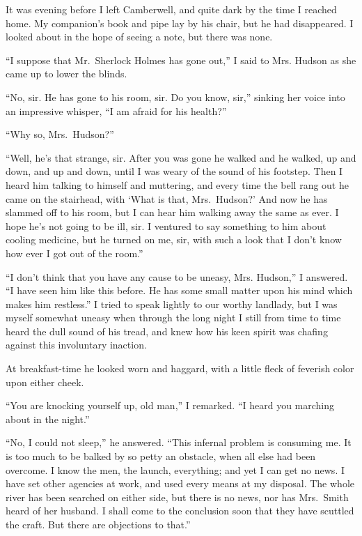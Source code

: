 \documentclass[12pt,english,oneside]{book}
\begin{document}
It was evening before I left Camberwell, and quite dark by the time
I reached home. My companion's book and pipe lay by his chair, but
he had disappeared. I looked about in the hope of seeing a note, but
there was none.

{}``I suppose that Mr.\ Sherlock Holmes has gone out,'' I said
to Mrs. Hudson as she came up to lower the blinds.

{}``No, sir. He has gone to his room, sir. Do you know, sir,'' sinking
her voice into an impressive whisper, {}``I am afraid for his health?''

{}``Why so, Mrs.\ Hudson?''

{}``Well, he's that strange, sir. After you was gone he walked and
he walked, up and down, and up and down, until I was weary of the
sound of his footstep. Then I heard him talking to himself and muttering,
and every time the bell rang out he came on the stairhead, with `What
is that, Mrs.\ Hudson?' And now he has slammed off to his room, but
I can hear him walking away the same as ever. I hope he's not going
to be ill, sir. I ventured to say something to him about cooling medicine,
but he turned on me, sir, with such a look that I don't know how ever
I got out of the room.''

{}``I don't think that you have any cause to be uneasy, Mrs. Hudson,''
I answered. {}``I have seen him like this before. He has some small
matter upon his mind which makes him restless.'' I tried to speak
lightly to our worthy landlady, but I was myself somewhat uneasy when
through the long night I still from time to time heard the dull sound
of his tread, and knew how his keen spirit was chafing against this
involuntary inaction.

At breakfast-time he looked worn and haggard, with a little fleck
of feverish color upon either cheek.

{}``You are knocking yourself up, old man,'' I remarked. {}``I
heard you marching about in the night.''

{}``No, I could not sleep,'' he answered. {}``This infernal problem
is consuming me. It is too much to be balked by so petty an obstacle,
when all else had been overcome. I know the men, the launch, everything;
and yet I can get no news. I have set other agencies at work, and
used every means at my disposal. The whole river has been searched
on either side, but there is no news, nor has Mrs.\ Smith heard of
her husband. I shall come to the conclusion soon that they have scuttled
the craft. But there are objections to that.''
\end{document}
